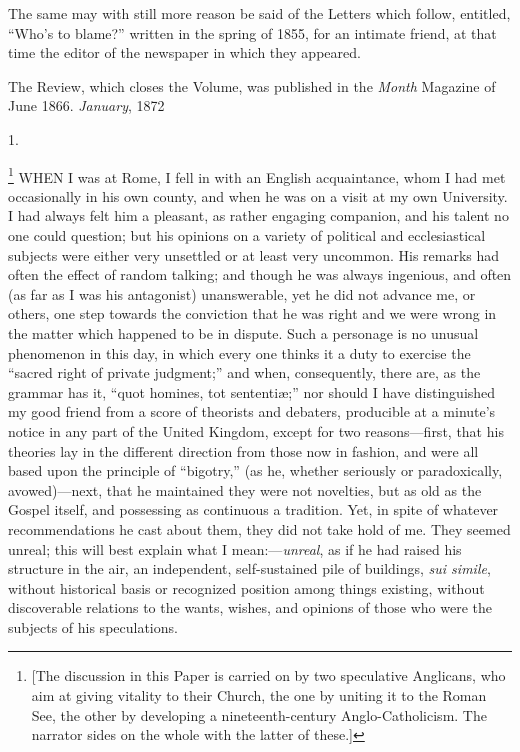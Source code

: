 The same may with still more reason be said of the Letters which
follow, entitled, ``Who's to blame?'' written in the spring of
1855, for an intimate friend, at that time the editor of the newspaper
in which they appeared.


The Review, which closes the Volume, was published in the \emph{Month}
Magazine of June 1866.
\emph{January}, 1872


1.

\footnote{[The discussion in this Paper is carried on by
two speculative Anglicans, who aim at giving vitality to their Church,
the one by uniting it to the Roman See, the other by developing a
nineteenth-century Anglo-Catholicism. The narrator sides on the whole
with the latter of these.]} WHEN
I was at Rome, I fell in with an English acquaintance, whom I had met
occasionally in his own county, and when he was on a visit at my own
University. I had always felt him a pleasant, as rather engaging
companion, and his talent no one could question; but his opinions on a
variety of political and ecclesiastical subjects were either very
unsettled or at least very uncommon. His remarks had often the effect
of random talking; and though he was always ingenious, and often (as
far as I was his antagonist) unanswerable, yet he did not advance me,
or others, one step towards the conviction that he was right and we
were wrong in the matter which happened to be in dispute. Such a
personage is no unusual phenomenon in this day, in which every one
thinks it a duty to exercise the ``sacred right of private
judgment;'' and when, consequently, there are, as the grammar has it, ``quot
homines, tot sententiæ;'' nor should I have distinguished my good
friend from a score of theorists and debaters, producible at a minute's
notice in any part of the United Kingdom, except for two
reasons—first, that his theories lay in the different direction from
those now in fashion, and were all based upon the principle of ``bigotry,''
(as he, whether seriously or paradoxically, avowed)—next, that he
maintained they were not novelties, but as old as the Gospel itself,
and possessing as continuous a tradition. Yet, in spite of whatever
recommendations he cast about them, they did not take hold of me. They
seemed unreal; this will best explain what I mean:—\emph{unreal}, as
if he had raised his structure in the air, an independent,
self-sustained pile of buildings, \emph{sui simile}, without
historical basis or recognized position among things existing, without
discoverable relations to the wants, wishes, and opinions of those who
were the subjects of his speculations.

